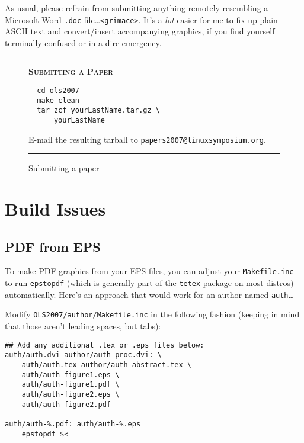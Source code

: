 \documentclass[final]{ols}
\providecommand{\XFname}{OLS}
\providecommand{\XFuname}{papers2007}
\providecommand{\XFaddr}{linuxsymposium}
\providecommand{\XFyear}{2007}
\begin{document}
As usual, please refrain from submitting anything remotely resembling
a Microsoft Word \texttt{.doc} file\ldots \texttt{<grimace>}.  It's a
\textit{lot} easier for me to fix up plain ASCII text and
convert/insert accompanying graphics, if you find yourself terminally
confused or in a dire emergency.

\begin{figure}[!ht]
\begin{shaded}
\begin{center}
\hrule
\vspace*{2mm}
\textbf{\textsc{Submitting a Paper}}
\begin{footnotesize}
\begin{verbatim}
  cd ols2007
  make clean
  tar zcf yourLastName.tar.gz \
      yourLastName
\end{verbatim}

E-mail the resulting tarball to
\texttt{{\XFuname}{@}{\XFaddr}{.}org}.
\end{footnotesize}
\vspace*{2mm}
\hrule

\caption{Submitting a paper}
\label{lockhart-fig1}

\end{center}
\end{shaded}
\end{figure}

\section{Build Issues}

\subsection{PDF from EPS}

To make PDF graphics from your EPS files, you can adjust your
\texttt{Makefile.inc} to run \texttt{epstopdf} (which is generally part of the
\texttt{tetex} package on most distros) automatically.  Here's an
approach that would work for an author named \texttt{auth}\ldots

Modify \texttt{\small{\XFname}{\XFyear}/author/Makefile.inc} in the following fashion
(keeping in mind that those aren't leading spaces, but tabs):

\begin{scriptsize}
\begin{verbatim}
## Add any additional .tex or .eps files below:
auth/auth.dvi author/auth-proc.dvi: \
    auth/auth.tex author/auth-abstract.tex \
    auth/auth-figure1.eps \
    auth/auth-figure1.pdf \
    auth/auth-figure2.eps \
    auth/auth-figure2.pdf 

auth/auth-%.pdf: auth/auth-%.eps
    epstopdf $<
\end{verbatim} %
\end{scriptsize}
\end{document}
